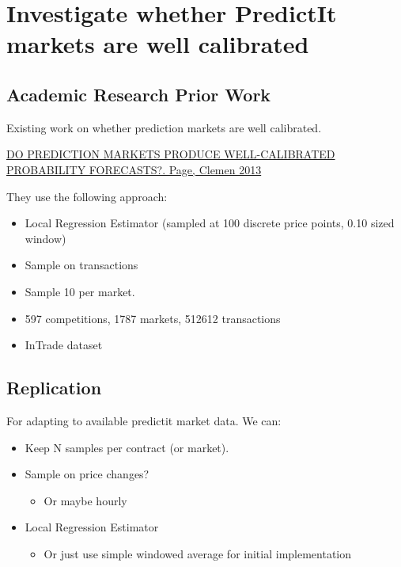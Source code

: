 \documentclass[
]{article}
\author{}
\date{}
\providecommand{\tightlist}{%
  \setlength{\itemsep}{0pt}\setlength{\parskip}{0pt}}
\renewcommand{\tightlist}{%
  \setlength{\itemsep}{1pt}\setlength{\parskip}{1pt}}
\begin{document}
\hypertarget{investigate-whether-predictit-markets-are-well-calibrated}{%
\section{Investigate whether PredictIt markets are well
calibrated}\label{investigate-whether-predictit-markets-are-well-calibrated}}

\hypertarget{academic-research-prior-work}{%
\subsection{Academic Research Prior
Work}\label{academic-research-prior-work}}

Existing work on whether prediction markets are well calibrated.

\href{page_clemen_ej_2013.pdf}{DO PREDICTION MARKETS PRODUCE
WELL-CALIBRATED PROBABILITY FORECASTS?. Page, Clemen 2013}

They use the following approach:

\begin{itemize}
\tightlist
\item
  Local Regression Estimator (sampled at 100 discrete price points, 0.10
  sized window)
\item
  Sample on transactions
\item
  Sample 10 per market.
\item
  597 competitions, 1787 markets, 512612 transactions
\item
  InTrade dataset
\end{itemize}

\hypertarget{replication}{%
\subsection{Replication}\label{replication}}

For adapting to available predictit market data. We can:

\begin{itemize}
\tightlist
\item
  Keep N samples per contract (or market).
\item
  Sample on price changes?

  \begin{itemize}
  \tightlist
  \item
    Or maybe hourly
  \end{itemize}
\item
  Local Regression Estimator

  \begin{itemize}
  \tightlist
  \item
    Or just use simple windowed average for initial implementation
  \end{itemize}
\end{itemize}
\end{document}
